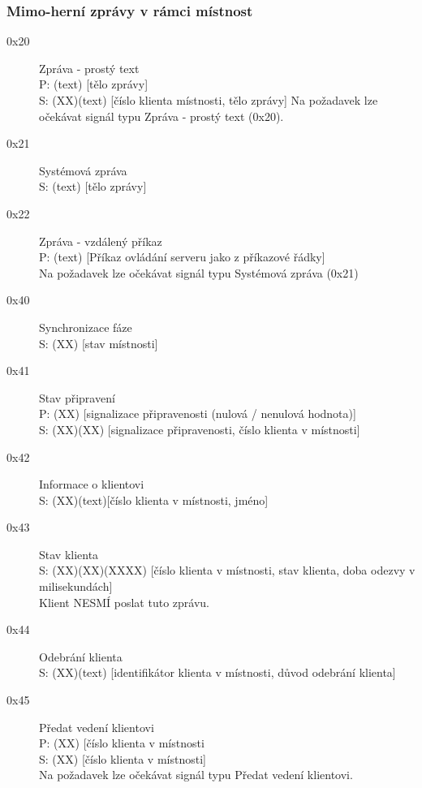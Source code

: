 \documentclass[12pt,a4paper]{article}
\begin{document}
\subsubsection*{Mimo-herní zprávy v rámci místnost}
\begin{description}
\item[0x20] Zpráva - prostý text \\
P: (text) [tělo zprávy] \\
S: (XX)(text) [číslo klienta místnosti, tělo zprávy]
Na požadavek lze očekávat signál typu Zpráva - prostý text (0x20).
\item[0x21] Systémová zpráva \\
S: (text) [tělo zprávy]
\item[0x22]Zpráva - vzdálený příkaz \\
P: (text) [Příkaz ovládání serveru jako z příkazové řádky] \\
Na požadavek lze očekávat signál typu Systémová zpráva (0x21)
\item[0x40] Synchronizace fáze \\
S: (XX) [stav místnosti]
\item[0x41] Stav připravení \\
P: (XX) [signalizace připravenosti (nulová / nenulová hodnota)] \\
S: (XX)(XX) [signalizace připravenosti, číslo klienta v místnosti]
\item[0x42] Informace o klientovi \\
S: (XX)(text)[číslo klienta v místnosti, jméno]
\item[0x43] Stav klienta \\
S: (XX)(XX)(XXXX) [číslo klienta v místnosti, stav klienta, doba odezvy v milisekundách] \\ 
Klient NESMÍ poslat tuto zprávu.
\item[0x44] Odebrání klienta \\
S: (XX)(text) [identifikátor klienta v místnosti, důvod odebrání klienta]
\item[0x45] Předat vedení klientovi \\
P: (XX) [číslo klienta v místnosti \\
S: (XX) [číslo klienta v místnosti] \\
Na požadavek lze očekávat signál typu Předat vedení klientovi.
\end{description}
\end{document}
